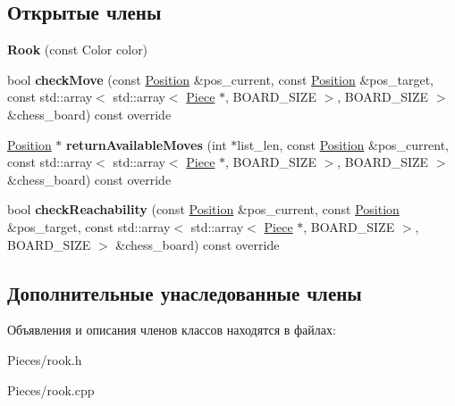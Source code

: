 \subsection*{Открытые члены}
\begin{DoxyCompactItemize}
\item 
\mbox{\label{class_chess_1_1_rook_a6ea7f044b41cf7463f9e48381631ab38}} 
{\bfseries Rook} (const Color color)
\item 
\mbox{\label{class_chess_1_1_rook_a5c99e8a5076f9bf139f7b45c33989483}} 
bool {\bfseries check\+Move} (const \mbox{\hyperlink{class_chess_1_1_position}{Position}} \&pos\+\_\+current, const \mbox{\hyperlink{class_chess_1_1_position}{Position}} \&pos\+\_\+target, const std\+::array$<$ std\+::array$<$ \mbox{\hyperlink{class_chess_1_1_piece}{Piece}} $\ast$, B\+O\+A\+R\+D\+\_\+\+S\+I\+ZE $>$, B\+O\+A\+R\+D\+\_\+\+S\+I\+ZE $>$ \&chess\+\_\+board) const override
\item 
\mbox{\label{class_chess_1_1_rook_aeb9a352eea0c12eafb3b65aa9ae8b3ab}} 
\mbox{\hyperlink{class_chess_1_1_position}{Position}} $\ast$ {\bfseries return\+Available\+Moves} (int $\ast$list\+\_\+len, const \mbox{\hyperlink{class_chess_1_1_position}{Position}} \&pos\+\_\+current, const std\+::array$<$ std\+::array$<$ \mbox{\hyperlink{class_chess_1_1_piece}{Piece}} $\ast$, B\+O\+A\+R\+D\+\_\+\+S\+I\+ZE $>$, B\+O\+A\+R\+D\+\_\+\+S\+I\+ZE $>$ \&chess\+\_\+board) const override
\item 
\mbox{\label{class_chess_1_1_rook_a5ae20056849a9a1dc5fc25f731974c75}} 
bool {\bfseries check\+Reachability} (const \mbox{\hyperlink{class_chess_1_1_position}{Position}} \&pos\+\_\+current, const \mbox{\hyperlink{class_chess_1_1_position}{Position}} \&pos\+\_\+target, const std\+::array$<$ std\+::array$<$ \mbox{\hyperlink{class_chess_1_1_piece}{Piece}} $\ast$, B\+O\+A\+R\+D\+\_\+\+S\+I\+ZE $>$, B\+O\+A\+R\+D\+\_\+\+S\+I\+ZE $>$ \&chess\+\_\+board) const override
\end{DoxyCompactItemize}
\subsection*{Дополнительные унаследованные члены}


Объявления и описания членов классов находятся в файлах\+:\begin{DoxyCompactItemize}
\item 
Pieces/rook.\+h\item 
Pieces/rook.\+cpp\end{DoxyCompactItemize}

